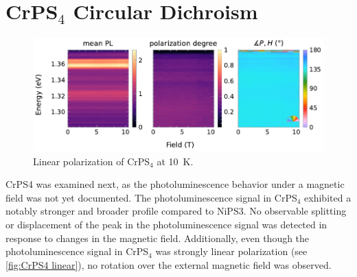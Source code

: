\documentclass[
	twoside,
	parskip=half,
	a4paper,
]{scrbook}
\begin{document}
\clearpage

\section{CrPS$_4$ Circular Dichroism}
\begin{figure}[b]
	\centering
	\includegraphics{../figures/2024-04-09 CrPS4 linear Polarisation.pdf}
	\caption{Linear polarization of CrPS$_4$ at \SI{10}{K}.}
	\label{fig:CrPS4 linear}
\end{figure}
CrPS4 was examined next, as the photoluminescence behavior under a magnetic field was not yet documented.
The photoluminescence signal in CrPS$_4$ exhibited a notably stronger and broader profile compared to NiPS3.
No observable splitting or displacement of the peak in the photoluminescence signal was detected in response to changes in the magnetic field. 
Additionally, even though the photoluminescence signal in CrPS$_4$ was strongly linear polarization (see \autoref{fig:CrPS4 linear}), no rotation over the external magnetic field was observed.
\end{document}
